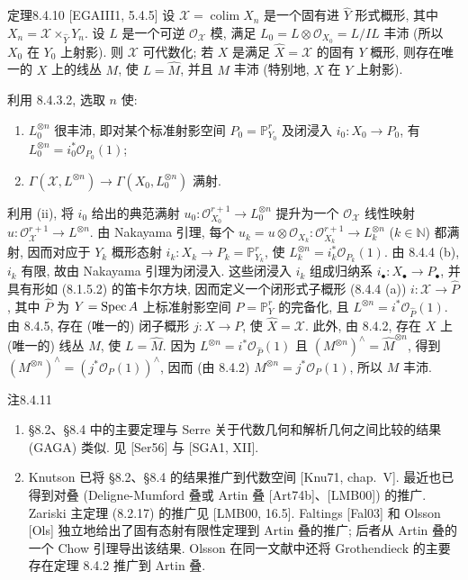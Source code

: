 \begin{origstatement}{定理}{8.4.10}\label{ch08:th8410}
[EGAIII1, 5.4.5] 设 $\mathcal X=\operatorname{colim}X_n$ 是一个固有进 $\widehat Y$ 形式概形, 其中 $X_n=\mathcal X\times_{\widehat Y}Y_n$. 设 $L$ 是一个可逆 $\mathcal O_{\mathcal X}$ 模, 满足 $L_0=L\otimes\mathcal O_{X_0}=L/IL$ 丰沛 (所以 $X_0$ 在 $Y_0$ 上射影). 则 $\mathcal X$ 可代数化; 若 $X$ 是满足 $\widehat X=\mathcal X$ 的固有 $Y$ 概形, 则存在唯一的 $X$ 上的线丛 $M$, 使 $L=\widehat M$, 并且 $M$ 丰沛 (特别地, $X$ 在 $Y$ 上射影).
\end{origstatement}
利用 8.4.3.2, 选取 $n$ 使:
\begin{enumerate}
\item[(i)] $L_0^{\otimes n}$ 很丰沛, 即对某个标准射影空间 $P_0=\mathbb P_{Y_0}^r$ 及闭浸入 $i_0:X_0\to P_0$, 有 $L_0^{\otimes n}=i_0^*\mathcal O_{P_0}(1)$;
\item[(ii)] $\Gamma(\mathcal X,L^{\otimes n})\to\Gamma(X_0,L_0^{\otimes n})$ 满射.
\end{enumerate}
利用 (ii), 将 $i_0$ 给出的典范满射 $u_0:\mathcal O_{X_0}^{r+1}\to L_0^{\otimes n}$ 提升为一个 $\mathcal O_{\mathcal X}$ 线性映射 $u:\mathcal O_{\mathcal X}^{r+1}\to L^{\otimes n}$. 由 Nakayama 引理, 每个 $u_k=u\otimes\mathcal O_{X_k}:\mathcal O_{X_k}^{r+1}\to L_k^{\otimes n}$ ($k\in\mathbb N$) 都满射, 因而对应于 $Y_k$ 概形态射 $i_k:X_k\to P_k=\mathbb P_{Y_k}^r$, 使 $L_k^{\otimes n}=i_k^*\mathcal O_{P_k}(1)$. 由 8.4.4 (b), $i_k$ 有限, 故由 Nakayama 引理为闭浸入. 这些闭浸入 $i_k$ 组成归纳系 $i_\bullet:X_\bullet\to P_\bullet$, 并具有形如 (8.1.5.2) 的笛卡尔方块, 因而定义一个闭形式子概形 (8.4.4 (a)) $i:\mathcal X\to\widehat P$, 其中 $\widehat P$ 为 $Y=\operatorname{Spec} A$ 上标准射影空间 $P=\mathbb P_Y^r$ 的完备化, 且 $L^{\otimes n}=i^*\mathcal O_{\widehat P}(1)$. 由 8.4.5, 存在 (唯一的) 闭子概形 $j:X\to P$, 使 $\widehat X=\mathcal X$. 此外, 由 8.4.2, 存在 $X$ 上 (唯一的) 线丛 $M$, 使 $L=\widehat M$. 因为 $L^{\otimes n}=i^*\mathcal O_{\widehat P}(1)$ 且 $(M^{\otimes n})^\wedge=\widehat M^{\otimes n}$, 得到 $(M^{\otimes n})^\wedge=(j^*\mathcal O_P(1))^\wedge$, 因而 (由 8.4.2) $M^{\otimes n}=j^*\mathcal O_P(1)$, 所以 $M$ 丰沛.

\begin{origstatement}{注}{8.4.11}\label{ch08:rem8411}
\begin{enumerate}
\item[(a)] §8.2、§8.4 中的主要定理与 Serre 关于代数几何和解析几何之间比较的结果 (GAGA) 类似. 见 [Ser56] 与 [SGA1, XII].
\item[(b)] Knutson 已将 §8.2、§8.4 的结果推广到代数空间 [Knu71, chap.~V]. 最近也已得到对叠 (Deligne-Mumford 叠或 Artin 叠 [Art74b]、[LMB00]) 的推广. Zariski 主定理 (8.2.17) 的推广见 [LMB00, 16.5]. Faltings [Fal03] 和 Olsson [Ols] 独立地给出了固有态射有限性定理到 Artin 叠的推广; 后者从 Artin 叠的一个 Chow 引理导出该结果. Olsson 在同一文献中还将 Grothendieck 的主要存在定理 8.4.2 推广到 Artin 叠.
\end{enumerate}
\end{origstatement}

